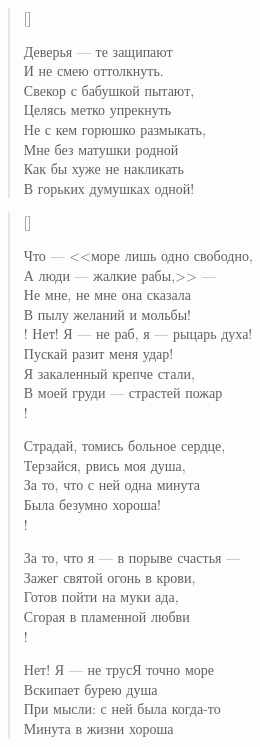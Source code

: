 \begin{verse}[\versewidth]
\begin{altverse}
Деверья --- те защипают\ldotst\\
    И не смею оттолкнуть.\\
Свекор с бабушкой пытают,\\
    Целясь метко упрекнуть\ldotst\\
Не с кем горюшко размыкать,\\
    Мне без матушки родной\ldotst\\
Как бы хуже не накликать\\
    В горьких думушках одной!\\
\end{altverse}
\end{verse}

\newpage
\vspace*{0cm}


\settowidth{\versewidth}{Что --- <<море лишь одно свободно,}
\begin{verse}[\versewidth]
\begin{altverse}
Что --- <<море лишь одно свободно,\\
А люди --- жалкие рабы,>> ---\\
Не мне, не мне она сказала\\
В пылу желаний и мольбы!\\!
Нет! Я --- не раб, я --- рыцарь духа!\\
Пускай разит меня удар!\\
Я закаленный крепче стали,\\
В моей груди --- страстей пожар\ldotse\\!

Страдай, томись больное сердце,\\
Терзайся, рвись моя душа,\\
За то, что с ней одна минута\\
Была безумно хороша!\\!

За то, что я --- в порыве счастья ---\\
Зажег святой огонь в крови,\\
Готов пойти на муки ада,\\
Сгорая в пламенной любви\ldotst\\!

Нет! Я --- не трус\ldotse Я точно море\ldotse\\
Вскипает бурею душа\\
При мысли: с ней была когда-то\\
Минута в жизни хороша\ldotst
\end{altverse}
\end{verse}

